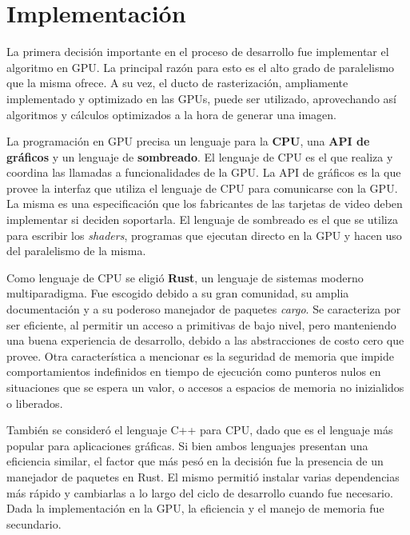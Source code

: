 \graphicspath{{chapters/4_implementación/figures}}

\chapter{Implementación}\label{chap:implementation}

La primera decisión importante en el proceso de desarrollo fue implementar el algoritmo en GPU.
La principal razón para esto es el alto grado de paralelismo que la misma ofrece.
A su vez, el ducto de rasterización, ampliamente implementado y optimizado en las GPUs, puede ser utilizado, aprovechando así algoritmos y cálculos optimizados a la hora de generar una imagen.

La programación en GPU precisa un lenguaje para la \textbf{CPU}, una \textbf{API de gráficos} y un lenguaje de \textbf{sombreado}.
El lenguaje de CPU es el que realiza y coordina las llamadas a funcionalidades de la GPU.
La API de gráficos es la que provee la interfaz que utiliza el lenguaje de CPU para comunicarse con la GPU.
La misma es una especificación que los fabricantes de las tarjetas de video deben implementar si deciden soportarla.
El lenguaje de sombreado es el que se utiliza para escribir los \textit{shaders}, programas que ejecutan directo en la GPU y hacen uso del paralelismo de la misma.

Como lenguaje de CPU se eligió \textbf{Rust}, un lenguaje de sistemas moderno multiparadigma.
Fue escogido debido a su gran comunidad, su amplia documentación y a su poderoso manejador de paquetes \textit{cargo}.  
Se caracteriza por ser eficiente, al permitir un acceso a primitivas de bajo nivel, pero manteniendo una buena experiencia de desarrollo, debido a las abstracciones de costo cero que provee.
Otra característica a mencionar es la seguridad de memoria que impide comportamientos indefinidos en tiempo de ejecución como punteros nulos en situaciones que se espera un valor, o accesos a espacios de memoria no inizialidos o liberados.

También se consideró el lenguaje C++ para CPU, dado que es el lenguaje más popular para aplicaciones gráficas.  
Si bien ambos lenguajes presentan una eficiencia similar, el factor que más pesó en la decisión fue la presencia de un manejador de paquetes en Rust.
El mismo permitió instalar varias dependencias más rápido y cambiarlas a lo largo del ciclo de desarrollo cuando fue necesario.
Dada la implementación en la GPU, la eficiencia y el manejo de memoria fue secundario. 

